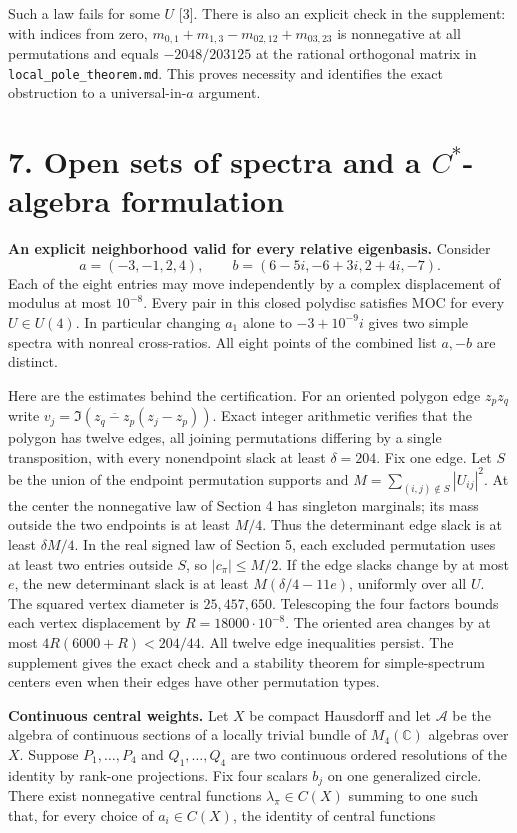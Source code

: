 \documentclass[11pt]{article}
\newcommand{\heading}[1]{\section*{\color{ink}#1}}
\newcommand{\C}{\mathbb C}\newcommand{\R}{\mathbb R}\newcommand{\E}{\mathbb E}\newcommand{\pr}{\mathbb P}
\begin{document}
\par Such a law fails for some $U$ [3]. There is also an explicit check in the supplement: with indices from zero, $m_{0,1}+m_{1,3}-m_{02,12}+m_{03,23}$ is nonnegative at all permutations and equals $-2048/203125$ at the rational orthogonal matrix in \texttt{local\_pole\_theorem.md}. This proves necessity and identifies the exact obstruction to a universal-in-$a$ argument.
\newpage
\heading{7. Open sets of spectra and a $C^*$-algebra formulation}
\textbf{An explicit neighborhood valid for every relative eigenbasis.} Consider
\[
 a=(-3,-1,2,4),\qquad b=(6-5i,-6+3i,2+4i,-7).
\]
Each of the eight entries may move independently by a complex displacement of modulus at most $10^{-8}$. Every pair in this closed polydisc satisfies MOC for every $U\in U(4)$. In particular changing $a_1$ alone to $-3+10^{-9}i$ gives two simple spectra with nonreal cross-ratios. All eight points of the combined list $a,-b$ are distinct.
\par Here are the estimates behind the certification. For an oriented polygon edge $z_pz_q$ write $v_j=\Im(\overline{z_q-z_p}(z_j-z_p))$. Exact integer arithmetic verifies that the polygon has twelve edges, all joining permutations differing by a single transposition, with every nonendpoint slack at least $\delta=204$. Fix one edge. Let $S$ be the union of the endpoint permutation supports and $M=\sum_{(i,j)\notin S}|U_{ij}|^2$. At the center the nonnegative law of Section 4 has singleton marginals; its mass outside the two endpoints is at least $M/4$. Thus the determinant edge slack is at least $\delta M/4$. In the real signed law of Section 5, each excluded permutation uses at least two entries outside $S$, so $|c_\pi|\le M/2$. If the edge slacks change by at most $e$, the new determinant slack is at least $M(\delta/4-11e)$, uniformly over all $U$. The squared vertex diameter is $25,457,650$. Telescoping the four factors bounds each vertex displacement by $R=18000\cdot10^{-8}$. The oriented area changes by at most $4R(6000+R)<204/44$. All twelve edge inequalities persist. The supplement gives the exact check and a stability theorem for simple-spectrum centers even when their edges have other permutation types.
\par\textbf{Continuous central weights.} Let $X$ be compact Hausdorff and let $\mathcal A$ be the algebra of continuous sections of a locally trivial bundle of $M_4(\C)$ algebras over $X$. Suppose $P_1,\ldots,P_4$ and $Q_1,\ldots,Q_4$ are two continuous ordered resolutions of the identity by rank-one projections. Fix four scalars $b_j$ on one generalized circle. There exist nonnegative central functions $\lambda_\pi\in C(X)$ summing to one such that, for every choice of $a_i\in C(X)$, the identity of central functions
\end{document}
